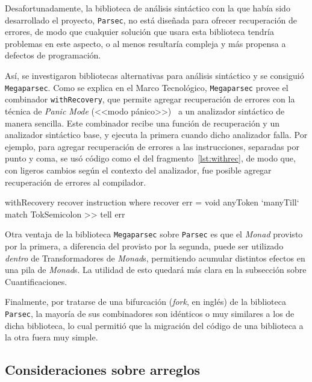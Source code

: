 Desafortunadamente, la biblioteca de análisis sintáctico con la que había sido
desarrollado el proyecto, \texttt{Parsec}, no está diseñada para ofrecer
recuperación de errores, de modo que cualquier solución que usara esta
biblioteca tendría problemas en este aspecto, o al menos resultaría compleja y
más propensa a defectos de programación.

Así, se investigaron bibliotecas alternativas para análisis sintáctico y se
consiguió \texttt{Megaparsec}. Como se explica en el Marco Tecnológico,
\texttt{Megaparsec} provee el combinador \texttt{withRecovery}, que permite
agregar recuperación de errores con la técnica de \textit{Panic Mode} (<<modo
pánico>>)~\cite{aho2} a un analizador sintáctico de manera sencilla. Este
combinador recibe una función de recuperación y un analizador sintáctico base, y
ejecuta la primera cuando dicho analizador falla. Por ejemplo, para agregar
recuperación de errores a las instrucciones, separadas por punto y coma, se usó
código como el del fragmento~\ref{lst:withrec}, de modo que, con ligeros cambios
según el contexto del analizador, fue posible agregar recuperación de errores al
compilador.

\begin{haskellcode}[caption=Uso de \texttt{withRecovery}, label=lst:withrec]
withRecovery recover instruction
  where
    recover err = void anyToken `manyTill` match TokSemicolon
               >> tell err
\end{haskellcode}

Otra ventaja de la biblioteca \texttt{Megaparsec} sobre \texttt{Parsec} es que
el \emph{Monad} provisto por la primera, a diferencia del provisto por la
segunda, puede ser utilizado \emph{dentro} de Transformadores de \emph{Monad}s,
permitiendo acumular distintos efectos en una pila de \emph{Monad}s. La utilidad
de esto quedará más clara en la subsección sobre Cuantificaciones.

Finalmente, por tratarse de una bifurcación (\emph{fork}, en inglés) de la
biblioteca \texttt{Parsec}, la mayoría de sus combinadores son idénticos o muy
similares a los de dicha biblioteca, lo cual permitió que la migración del
código de una biblioteca a la otra fuera muy simple.

\subsection{Consideraciones sobre arreglos}

